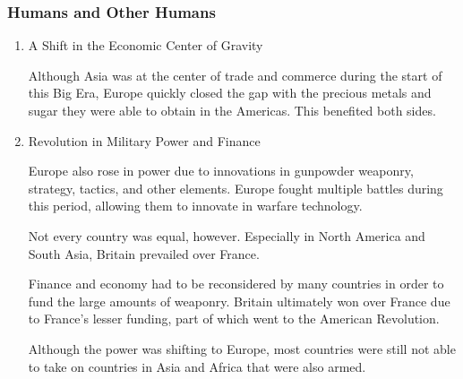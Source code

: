 \documentclass[11pt]{article}
\begin{document}
\subsubsection{Humans and Other Humans}
\label{sec:orgb23955d}
\begin{enumerate}
\item A Shift in the Economic Center of Gravity
\label{sec:org6e0af17}

Although Asia was at the center of trade and commerce during the start of this Big Era, Europe quickly closed the gap with the precious metals and sugar they were able to obtain in the Americas. This benefited both sides.

\item Revolution in Military Power and Finance
\label{sec:org3951fd4}

Europe also rose in power due to innovations in gunpowder weaponry, strategy, tactics, and other elements. Europe fought multiple battles during this period, allowing them to innovate in warfare technology.

Not every country was equal, however. Especially in North America and South Asia, Britain prevailed over France.

Finance and economy had to be reconsidered by many countries in order to fund the large amounts of weaponry. Britain ultimately won over France due to France's lesser funding, part of which went to the American Revolution.

Although the power was shifting to Europe, most countries were still not able to take on countries in Asia and Africa that were also armed.
\end{enumerate}
\end{document}
